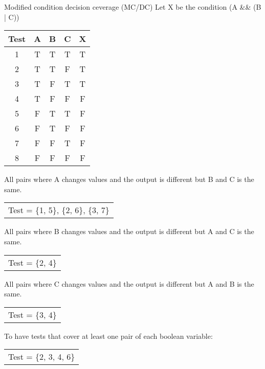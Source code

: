 \begin{exampleblock}{Modified condition decision ceverage (MC/DC)}
    Let X be the condition (A \&\& (B | C))
    \begin{tabular}{|c|c|c|c|c|}
        \hline
        Test & A & B & C & X \\
        \hline
        1 & T & T & T & T \\
        \hline
        2 & T & T & F & T \\
        \hline
        3 & T & F & T & T \\
        \hline
        4 & T & F & F & F \\
        \hline
        5 & F & T & T & F \\
        \hline
        6 & F & T & F & F \\
        \hline
        7 & F & F & T & F \\
        \hline
        8 & F & F & F & F \\
        \hline
    \end{tabular}\newline

    All pairs where A changes values and the output is different but B and C is the same.\newline
    \begin{tabular}{ c }
        Test = \{1, 5\}, \{2, 6\}, \{3, 7\}
    \end{tabular}\newline

    All pairs where B changes values and the output is different but A and C is the same.\newline
    \begin{tabular}{ c }
        Test = \{2, 4\}
    \end{tabular}\newline

    All pairs where C changes values and the output is different but A and B is the same.\newline
    \begin{tabular}{ c }
        Test = \{3, 4\}
    \end{tabular}\newline

    To have tests that cover at least one pair of each boolean variable:\newline
    \begin{tabular}{ c }
        Test = \{2, 3, 4, 6\}
    \end{tabular}
\end{exampleblock}

